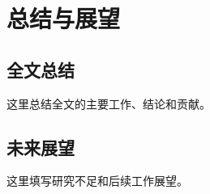 
\chapter{总结与展望}
\label{ch:conclusion}

\section{全文总结}

这里总结全文的主要工作、结论和贡献。

\section{未来展望}

这里填写研究不足和后续工作展望。
